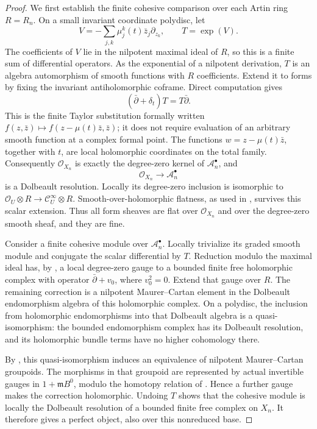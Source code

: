 \documentclass[11pt]{article}
\theoremstyle{definition}
\theoremstyle{remark}
\begin{document}
\begin{proof}
We first establish the finite cohesive comparison over each Artin
ring $R=R_n$.  On a small invariant coordinate polydisc, let
\[
 V=-\sum_{j,k}\mu_j^k(t)\bar z_j\partial_{z_k},
 \qquad T=\exp(V).
\]
The coefficients of $V$ lie in the nilpotent maximal ideal of $R$,
so this is a finite sum of differential operators.  As the
exponential of a nilpotent derivation, $T$ is an algebra
automorphism of smooth functions with $R$ coefficients.  Extend
it to forms by fixing the invariant antiholomorphic coframe.
Direct computation gives
\[
 (\bar\partial+\delta_t)T=T\bar\partial.
\]
This is the finite Taylor substitution formally written
$f(z,\bar z)\mapsto f(z-\mu(t)\bar z,\bar z)$; it does not
require evaluation of an arbitrary smooth function at a complex
formal point.  The functions $w=z-\mu(t)\bar z$, together with
$t$, are local holomorphic coordinates on the total family.
Consequently $\mathcal O_{X_n}$ is exactly the degree-zero
kernel of $\mathcal A_n^\bullet$, and
\[
 \mathcal O_{X_n}\longrightarrow\mathcal A_n^\bullet
\]
is a Dolbeault resolution.  Locally its degree-zero inclusion
is isomorphic to
$\mathcal O_U\otimes R\to\mathcal C_U^\infty\otimes R$.
Smooth-over-holomorphic flatness, as used in
\cite[proof of Theorem~8.3]{CHLCohesive}, survives this scalar
extension.  Thus all form sheaves are flat over $\mathcal O_{X_n}$
and over the degree-zero smooth sheaf, and they are fine.

Consider a finite cohesive module over $\mathcal A_n^\bullet$.
Locally trivialize its graded smooth module and conjugate the
scalar differential by $T$.  Reduction modulo the maximal ideal
has, by \cite[Lemma~4.1.5]{BlockCohesive}, a local degree-zero
gauge to a bounded finite free holomorphic complex with operator
$\bar\partial+v_0$, where $v_0^2=0$.  Extend that gauge over $R$.
The remaining correction is a nilpotent Maurer--Cartan element
in the Dolbeault endomorphism algebra of this holomorphic complex.
On a polydisc, the inclusion from holomorphic endomorphisms into
that Dolbeault algebra is a quasi-isomorphism: the bounded
endomorphism complex has its Dolbeault resolution, and its
holomorphic bundle terms have no higher cohomology there.

By \cite[Theorem~8.1]{ELODeformations}, this quasi-isomorphism
induces an equivalence of nilpotent Maurer--Cartan groupoids.
The morphisms in that groupoid are represented by actual
invertible gauges in $1+\mathfrak m B^0$, modulo the homotopy
relation of \cite[Definition~5.2]{ELODeformations}.  Hence a
further gauge makes the correction holomorphic.  Undoing $T$
shows that the cohesive module is locally the Dolbeault resolution
of a bounded finite free complex on $X_n$.  It therefore gives
a perfect object, also over this nonreduced base.


\end{proof}
\end{document}
